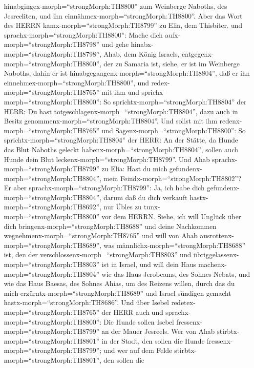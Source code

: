hinabgingex-morph=``strongMorph:TH8800'' zum Weinberge Naboths, des
Jesreeliten, und ihn einnähmex-morph=``strongMorph:TH8800''.
 Aber das Wort des HERRN kamx-morph=``strongMorph:TH8799''
zu Elia, dem Thisbiter, und sprachx-morph=``strongMorph:TH8800'':
 Mache dich aufx-morph=``strongMorph:TH8798'' und gehe
hinabx-morph=``strongMorph:TH8798'', Ahab, dem König Israels,
entgegenx-morph=``strongMorph:TH8800'', der zu Samaria ist, siehe, er
ist im Weinberge Naboths, dahin er ist
hinabgegangenx-morph=``strongMorph:TH8804'', daß er ihn
einnehmex-morph=``strongMorph:TH8800'',  und
redex-morph=``strongMorph:TH8765'' mit ihm und
sprichx-morph=``strongMorph:TH8800'': So
sprichtx-morph=``strongMorph:TH8804'' der HERR: Du hast
totgeschlagenx-morph=``strongMorph:TH8804'', dazu auch in Besitz
genommenx-morph=``strongMorph:TH8804''. Und sollst mit ihm
redenx-morph=``strongMorph:TH8765'' und
Sagenx-morph=``strongMorph:TH8800'': So
sprichtx-morph=``strongMorph:TH8804'' der HERR: An der Stätte, da Hunde
das Blut Naboths geleckt habenx-morph=``strongMorph:TH8804'', sollen
auch Hunde dein Blut leckenx-morph=``strongMorph:TH8799''. 
Und Ahab sprachx-morph=``strongMorph:TH8799'' zu Elia: Hast du mich
gefundenx-morph=``strongMorph:TH8804'', mein
Feindx-morph=``strongMorph:TH8802''? Er aber
sprachx-morph=``strongMorph:TH8799'': Ja, ich habe dich
gefundenx-morph=``strongMorph:TH8804'', darum daß du dich verkauft
hastx-morph=``strongMorph:TH8692'', nur Übles zu
tunx-morph=``strongMorph:TH8800'' vor dem HERRN.  Siehe,
ich will Unglück über dich bringenx-morph=``strongMorph:TH8688'' und
deine Nachkommen wegnehmenx-morph=``strongMorph:TH8765'' und will von
Ahab ausrottenx-morph=``strongMorph:TH8689'', was
männlichx-morph=``strongMorph:TH8688'' ist, den der
verschlossenx-morph=``strongMorph:TH8803'' und
übriggelassenx-morph=``strongMorph:TH8803'' ist in Israel, 
und will dein Haus machenx-morph=``strongMorph:TH8804'' wie das Haus
Jerobeams, des Sohnes Nebats, und wie das Haus Baesas, des Sohnes Ahias,
um des Reizens willen, durch das du mich
erzürntx-morph=``strongMorph:TH8689'' und Israel sündigen gemacht
hastx-morph=``strongMorph:TH8686''.  Und über Isebel
redetex-morph=``strongMorph:TH8765'' der HERR auch und
sprachx-morph=``strongMorph:TH8800'': Die Hunde sollen Isebel
fressenx-morph=``strongMorph:TH8799'' an der Mauer Jesreels.
 Wer von Ahab stirbtx-morph=``strongMorph:TH8801'' in der
Stadt, den sollen die Hunde fressenx-morph=``strongMorph:TH8799''; und
wer auf dem Felde stirbtx-morph=``strongMorph:TH8801'', den sollen die
